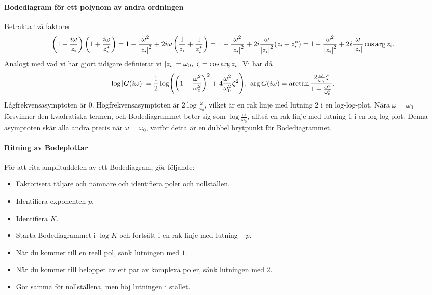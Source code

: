 \paragraph{Bodediagram för ett polynom av andra ordningen}
Betrakta två faktorer
\begin{align*}
	\left(1 +\frac{i\omega}{z_{i}}\right)\left(1 +\frac{i\omega}{z_{i}^{*}}\right) = 1 - \frac{\omega^{2}}{\abs{z_{i}}^{2}} + 2i\omega\left(\frac{1}{z_{i}} + \frac{1}{z_{i}^{*}}\right) = 1 - \frac{\omega^{2}}{\abs{z_{i}}^{2}} + 2i\frac{\omega}{\abs{z_{i}}^{2}}(z_{i} + z_{i}^{*}) = 1 - \frac{\omega^{2}}{\abs{z_{i}}^{2}} + 2i\frac{\omega}{\abs{z_{i}}}\cos{\arg{z_{i}}}.
\end{align*}
Analogt med vad vi har gjort tidigare definierar vi $\abs{z_{i}} = \omega_{0},\ \zeta = \cos{\arg{z_{i}}}$. Vi har då
\begin{align*}
\log{\abs{G(i\omega)}} = \frac{1}{2}\log(\left(1 - \frac{\omega^{2}}{\omega_{0}^{2}}\right)^{2} + 4\frac{\omega^{2}}{\omega_{0}^{2}}\zeta^{2}),\ \arg{G(i\omega)} = \arctan{\frac{2\frac{\omega}{\omega_{0}}\zeta}{1 - \frac{\omega^{2}}{\omega_{0}^{2}}}}.
\end{align*}
Lågfrekvensasymptoten är $0$. Högfrekvensasymptoten är $2\log{\frac{\omega}{\omega_{0}}}$, vilket är en rak linje med lutning $2$ i en log-log-plot. Nära $\omega = \omega_{0}$ försvinner den kvadratiska termen, och Bodediagrammet beter sig som $\log{\frac{\omega}{\omega_{0}}}$, alltså en rak linje med lutning $1$ i en log-log-plot. Denna asymptoten skär alla andra precis när $\omega = \omega_{0}$, varför detta är en dubbel brytpunkt för Bodediagrammet.

\paragraph{Ritning av Bodeplottar}
För att rita amplituddelen av ett Bodediagram, gör följande:
\begin{itemize}
	\item Faktorisera täljare och nämnare och identifiera poler och nollställen.
	\item Identifiera exponenten $p$.
	\item Identifiera $K$.
	\item Starta Bodediagrammet i $\log{K}$ och fortsätt i en rak linje med lutning $-p$.
	\item När du kommer till en reell pol, sänk lutningen med $1$.
	\item När du kommer till beloppet av ett par av komplexa poler, sänk lutningen med $2$.
	\item Gör samma för nollställena, men höj lutningen i stället.
\end{itemize}

